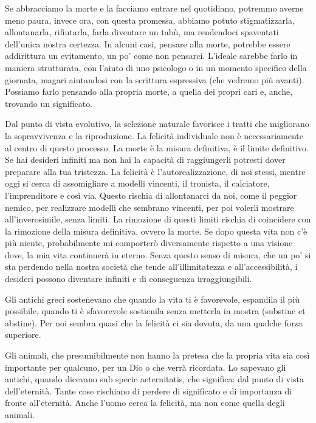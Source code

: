 \documentclass[12pt]{book} %
\begin{document}
Se abbracciamo la morte e la facciamo
entrare nel quotidiano, potremmo averne meno paura, invece ora, con questa promessa, abbiamo potuto stigmatizzarla,
allontanarla, rifiutarla, farla diventare un tabù, ma rendendoci spaventati dell'unica nostra
certezza.
In alcuni casi, pensare alla morte, potrebbe essere addirittura un evitamento, un po' come non pensarci.
L'ideale sarebbe farlo in maniera strutturata, con l'aiuto di uno psicologo o in un momento specifico della giornata, magari aiutandosi con la scrittura espressiva (che vedremo più avanti). Possiamo farlo pensando alla propria morte, a quella dei propri cari e, anche, trovando un significato.

Dal punto di vista evolutivo, la selezione naturale favorisce i tratti che migliorano la sopravvivenza e la riproduzione. La felicità individuale non è necessariamente al centro di questo processo. La morte è la misura definitiva, è il limite
definitivo. Se hai desideri infiniti ma non hai la capacità di raggiungerli potresti dover preparare alla tua tristezza. 
La felicità è l'autorealizzazione, di noi stessi, mentre oggi si cerca di assomigliare a
modelli vincenti, il tronista, il calciatore, l'imprenditore e così via. Questo rischia di allontanarci da noi, come il peggior nemico, per realizzare modelli che sembrano vincenti, per poi volerli mostrare all'inverosimile, senza limiti. La rimozione di questi limiti rischia di coincidere con la rimozione della misura definitiva, ovvero la morte. Se dopo questa vita non c'è più niente, probabilmente mi comporterò diversamente rispetto a una
visione dove, la mia vita continuerà in eterno. Senza questo senso di misura, che un po' si sta perdendo nella nostra società che tende all'illimitatezza e all'accessibilità, i desideri possono diventare infiniti e di conseguenza irraggiungibili.

Gli antichi greci sostenevano che quando la vita ti è favorevole, espandila il più possibile, quando ti è sfavorevole
sostienila senza metterla in mostra (substine et abstine). Per noi sembra quasi che la felicità ci sia dovuta, da una
qualche forza superiore.

Gli animali, che presumibilmente non hanno la pretesa che la propria vita sia così importante per qualcuno, per un Dio o che verrà
ricordata. Lo sapevano gli
antichi, quando dicevano sub specie aeternitatis, che significa: dal punto di vista dell'eternità. Tante cose rischiano di perdere di
significato e di importanza di fronte all'eternità. Anche l'uomo cerca la felicità, ma non come quella degli animali.
\end{document}
